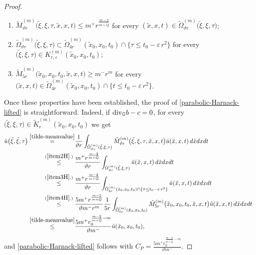 \documentclass[11pt,a4paper]{article}
\numberwithin{equation}{section}
\def \tt {\tilde}
\def \GG {{\mathbb{G}}}
\def \div {{\text{\rm div}}}
\def \e {{\varepsilon}}
\def \t {{\tau}}
\def \x {{\xi}}
\def \O {{\Omega}}
\begin{document}
{{\begin{proof}
\begin{enumerate}
		\item $ \tt M_{\vartheta r}^{(m)} \big(\tt \x,\x,\t,\tt x,x,t\big) \leq m^+r^{\frac{m-2}{m+\tt Q}}$ for every $(\tt x, x,t)\in \tt \O^{(m)}_{\vartheta r}\big(\tt \x, \x, \t\big)$; \label{item2H}
		\item $\tt \O^{(m)}_{\vartheta r}\big(\tt \x,\x, \t\big)\subset \tt \O^{(m)}_{4 r}(\tt x_0, x_0, t_0)\cap \Big\{\t\leq t_0 - \e\,r^2\Big\}$ for every $\big(\tt \x, \x,\t\big)\in K_{r,\e}^{(m)}(\tt x_0, x_0, t_0)$;\label{item3H}
		\item $\tt M_{5r}^{(m)} \big(\tt x_0, x_0,t_0,\tt x, x,t\big) \geq m^- r^m$ for every $\big(\tt x, x,t\big)\in \tt \O^{(m)}_{4r}(\tt x_0, x_0, t_0)\cap \Big\{t\leq t_0 - \e\,r^2\Big\}$.\label{item4H}
	\end{enumerate}
	Once these properties have been established, the proof of \eqref{parabolic-Harnack-lifted} is straightforward. Indeed, if $\div_{\GG} b-c=0$, for every $\big(\tt\x,\x,\t\big)\in\tt K_r^{(m)}(\tt x_0, x_0, t_0)$  we get
	\begin{equation}\label{simple-harnack}
		\begin{aligned}
			\tt u\big(\tt\x,\tt \x,\t\big)\overset{\eqref{tilde-meanvalue}}=&\frac{1}{\vartheta r } \int_{\tt\Omega_{\vartheta r}^{(m)}(\tt\x,\x,\t)} \tt M_{\vartheta r}^{(m)} \big(\tt\x,\x,\t,\tt x, x,t\big) \tt u(\tt x,x,t) \, d\tt x d x dt \\
			\overset{(\ref{item2H}.)}\leq\;& \frac{m^+  r^{\frac{m-2}{m+\tt Q}} }{\vartheta r} \int_{\tt\Omega_{\vartheta r}^{(m)}(\tt \x,\x,\t)} \tt u(\tt x, x,t) \, d\tt x d x dt\\
			\overset{(\ref{item3H}.)}\leq\;& \frac{m^+r^{\frac{m-2}{m+\tt Q}} }{\vartheta r} \int_{\tt \O^{(m)}_{4 r}(\tt x_0, x_0, t_0)\cap \left\{\t\leq t_0 - \e\,r^2\right\}} \tt u(\tt x, x,t) \, d\tt x dx dt\\
			\overset{(\ref{item4H}.)}\leq\;& \frac{5m^+ r^{\frac{m-2}{m+\tt Q}} }{\vartheta m^- r^m }\frac{1}{5 r } \int_{\tt \O^{(m)}_{5r }(\tt x_0, x_0, t_0)} \tt M_{5r}^{(m)}  \big(\tt x_0, x_0,t_0,\tt x, x,t\big) \tt u(\tt x, x,t) \, d\tt x d x dt\\\overset{\eqref{tilde-meanvalue}}\leq&\frac{5m^+  r_0^{\frac{m-2}{m+\tt Q}-m} }{\vartheta m^-} \tt u(\tt x_0, x_0,t_0),
		\end{aligned}
	\end{equation}
	and \eqref{parabolic-Harnack-lifted} follows with $C_P = \frac{5m^+  r_0^{\frac{m-2}{m+\tt Q}-m} }{\vartheta m^-}$.
	
	\medskip
	

\end{proof}}}
\end{document}
